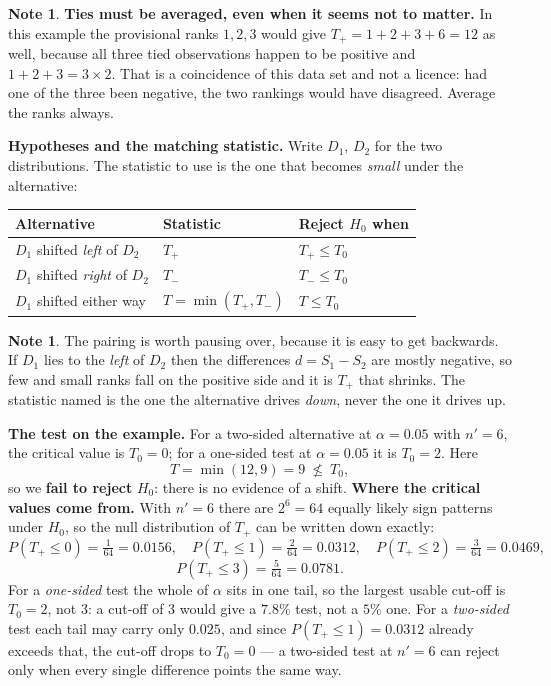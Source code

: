 \documentclass[11pt,a4paper]{article}
\theoremstyle{definition}
\newtheorem{note}[thm]{Note}
\begin{document}
\begin{note}
\textbf{Ties must be averaged, even when it seems not to matter.} In this example
the provisional ranks $1,2,3$ would give $T_{+} = 1+2+3+6 = 12$ as well, because
all three tied observations happen to be positive and $1+2+3 = 3 \times 2$. That
is a coincidence of this data set and not a licence: had one of the three been
negative, the two rankings would have disagreed. Average the ranks always.
\end{note}

\textbf{Hypotheses and the matching statistic.} Write $D_1$, $D_2$ for the two
distributions. The statistic to use is the one that becomes \emph{small} under the
alternative:

\begin{center}
\begin{tabular}{l|l|l}
Alternative & Statistic & Reject $H_0$ when\\
\hline
$D_1$ shifted \emph{left} of $D_2$ & $T_{+}$ & $T_{+} \leq T_0$\\
$D_1$ shifted \emph{right} of $D_2$ & $T_{-}$ & $T_{-} \leq T_0$\\
$D_1$ shifted either way & $T = \min(T_{+},T_{-})$ & $T \leq T_0$\\
\end{tabular}
\end{center}

\begin{note}
The pairing is worth pausing over, because it is easy to get backwards. If $D_1$
lies to the \emph{left} of $D_2$ then the differences $d = S_1 - S_2$ are mostly
negative, so few and small ranks fall on the positive side and it is $T_{+}$ that
shrinks. The statistic named is the one the alternative drives \emph{down}, never
the one it drives up.
\end{note}

\textbf{The test on the example.} For a two-sided alternative at
$\alpha = 0.05$ with $n' = 6$, the critical value is $T_0 = 0$; for a one-sided
test at $\alpha = 0.05$ it is $T_0 = 2$. Here
$$T = \min(12, 9) = 9 \ \not\leq\ T_0 ,$$
so we \textbf{fail to reject} $H_0$: there is no evidence of a shift.
\textbf{Where the critical values come from.} With $n' = 6$ there are $2^{6} = 64$
equally likely sign patterns under $H_0$, so the null distribution of $T_{+}$ can
be written down exactly:
$$P(T_{+} \leq 0) = \tfrac{1}{64} = 0.0156,\quad
P(T_{+} \leq 1) = \tfrac{2}{64} = 0.0312,\quad
P(T_{+} \leq 2) = \tfrac{3}{64} = 0.0469,$$
$$P(T_{+} \leq 3) = \tfrac{5}{64} = 0.0781 .$$
For a \emph{one-sided} test the whole of $\alpha$ sits in one tail, so the largest
usable cut-off is $T_0 = 2$, not $3$: a cut-off of $3$ would give a $7.8\%$ test,
not a $5\%$ one. For a \emph{two-sided} test each tail may carry only $0.025$, and
since $P(T_{+}\leq 1) = 0.0312$ already exceeds that, the cut-off drops to
$T_0 = 0$ --- a two-sided test at $n' = 6$ can reject only when every single
difference points the same way.
\end{document}
